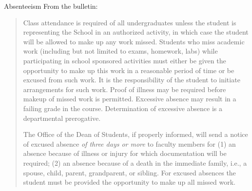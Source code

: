 \begin{frame}{Absenteeism}
From the bulletin:
\begin{quotation}
Class attendance is required of all undergraduates unless the student is representing the School in an authorized activity, in which case the student will be allowed to make up any work missed. Students who miss academic work (including but not limited to exams, homework, labs) while participating in school sponsored activities must either be given the opportunity to make up this work in a reasonable period of time or be excused from such work. It is the responsibility of the student to initiate arrangements for such work. Proof of illness may be required before makeup of missed work is permitted. Excessive absence may result in a failing grade in the course. Determination of excessive absence is a departmental prerogative.

The Office of the Dean of Students, if properly informed, will send a notice of excused absence {\em of three days or more} to faculty members for (1) an absence because of illness or injury for which documentation will be required; (2) an absence because of a death in the immediate family, i.e., a spouse, child, parent, grandparent, or sibling. For excused absences the student must be provided the opportunity to make up all missed work.

\end{quotation}
\end{frame}

